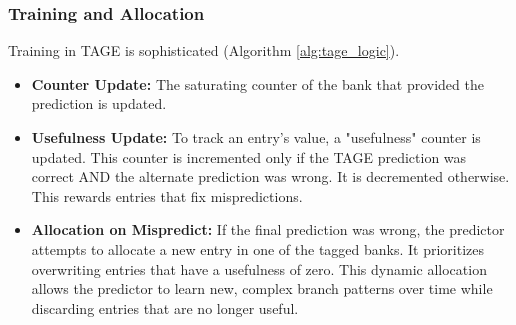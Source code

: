\documentclass[sigconf, screen]{acmart}
\begin{document}
\subsubsection{Training and Allocation}
Training in TAGE is sophisticated (Algorithm \ref{alg:tage_logic}).
\begin{itemize}
    \item \textbf{Counter Update:} The saturating counter of the bank that provided the prediction is updated.
    \item \textbf{Usefulness Update:} To track an entry's value, a "usefulness" counter is updated. This counter is incremented only if the TAGE prediction was correct AND the alternate prediction was wrong. It is decremented otherwise. This rewards entries that fix mispredictions.
    \item \textbf{Allocation on Mispredict:} If the final prediction was wrong, the predictor attempts to allocate a new entry in one of the tagged banks. It prioritizes overwriting entries that have a usefulness of zero. This dynamic allocation allows the predictor to learn new, complex branch patterns over time while discarding entries that are no longer useful.
\end{itemize}
\end{document}
